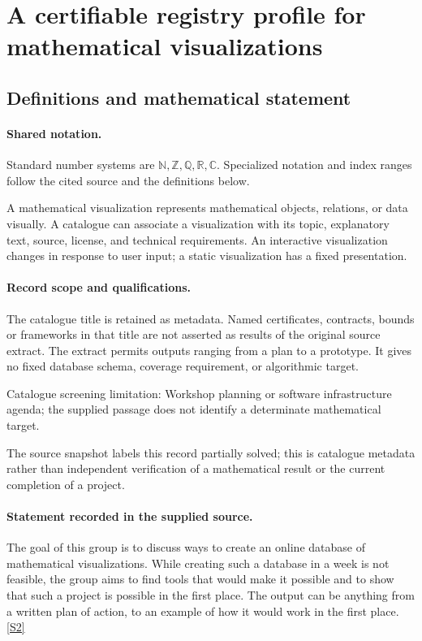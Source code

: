 \documentclass[11pt]{article}
\newcommand{\sref}[2]{\hyperlink{source:#1:#2}{[S#2]}}
\begin{document}
\section{A certifiable registry profile for mathematical visualizations}\label{statement}

\subsection{Definitions and mathematical statement}

\paragraph{Shared notation.}Standard number systems are $\mathbb N,\mathbb Z,\mathbb Q,\mathbb R,\mathbb C$. Specialized notation and index ranges follow the cited source and the definitions below.


A mathematical visualization represents mathematical objects, relations, or data visually. A catalogue can associate a visualization with its topic, explanatory text, source, license, and technical requirements. An interactive visualization changes in response to user input; a static visualization has a fixed presentation.
\paragraph{Record scope and qualifications.}
The catalogue title is retained as metadata. Named certificates, contracts, bounds or frameworks in that title are not asserted as results of the original source extract.
The extract permits outputs ranging from a plan to a prototype. It gives no fixed database schema, coverage requirement, or algorithmic target.

Catalogue screening limitation: Workshop planning or software infrastructure agenda; the supplied passage does not identify a determinate mathematical target.

The source snapshot labels this record partially solved; this is catalogue metadata rather than independent verification of a mathematical result or the current completion of a project.
\paragraph{Statement recorded in the supplied source.}
The goal of this group is to discuss ways to create an online database of mathematical visualizations. While creating such a database in a week is not feasible, the group aims to find tools that would make it possible and to show that such a project is possible in the first place. The output can be anything from a written plan of action, to an example of how it would work in the first place. \sref{statement}{2}
\end{document}
